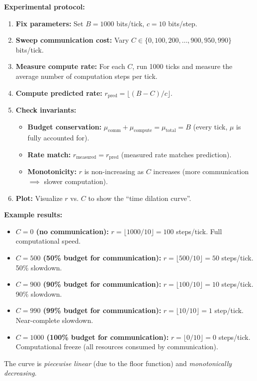 \textbf{Experimental protocol:}
\begin{enumerate}
    \item \textbf{Fix parameters:} Set $B = 1000$ bits/tick, $c = 10$ bits/step.
    
    \item \textbf{Sweep communication cost:} Vary $C \in \{0, 100, 200, \ldots, 900, 950, 990\}$ bits/tick.
    
    \item \textbf{Measure compute rate:} For each $C$, run 1000 ticks and measure the average number of computation steps per tick.
    
    \item \textbf{Compute predicted rate:} $r_{\text{pred}} = \lfloor (B - C) / c \rfloor$.
    
    \item \textbf{Check invariants:}
    \begin{itemize}
        \item \textbf{Budget conservation:} $\mu_{\text{comm}} + \mu_{\text{compute}} = \mu_{\text{total}} = B$ (every tick, $\mu$ is fully accounted for).
        \item \textbf{Rate match:} $r_{\text{measured}} = r_{\text{pred}}$ (measured rate matches prediction).
        \item \textbf{Monotonicity:} $r$ is non-increasing as $C$ increases (more communication $\implies$ slower computation).
    \end{itemize}
    
    \item \textbf{Plot:} Visualize $r$ vs. $C$ to show the ``time dilation curve''.
\end{enumerate}

\textbf{Example results:}
\begin{itemize}
    \item \textbf{$C = 0$ (no communication):} $r = \lfloor 1000 / 10 \rfloor = 100$ steps/tick. Full computational speed.
    \item \textbf{$C = 500$ (50\% budget for communication):} $r = \lfloor 500 / 10 \rfloor = 50$ steps/tick. 50\% slowdown.
    \item \textbf{$C = 900$ (90\% budget for communication):} $r = \lfloor 100 / 10 \rfloor = 10$ steps/tick. 90\% slowdown.
    \item \textbf{$C = 990$ (99\% budget for communication):} $r = \lfloor 10 / 10 \rfloor = 1$ step/tick. Near-complete slowdown.
    \item \textbf{$C = 1000$ (100\% budget for communication):} $r = \lfloor 0 / 10 \rfloor = 0$ steps/tick. Computational freeze (all resources consumed by communication).
\end{itemize}
The curve is \textit{piecewise linear} (due to the floor function) and \textit{monotonically decreasing}.


